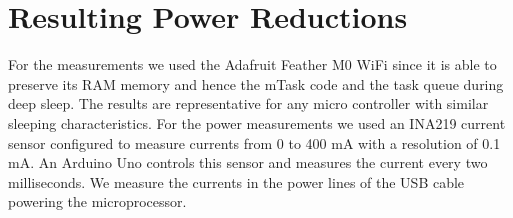 \documentclass[runningheads]{llncs}
\begin{document}







\section{Resulting Power Reductions}

For the measurements we used the Adafruit Feather M0 WiFi since it is able to preserve its RAM memory and hence the mTask code and the task queue during deep sleep.
The results are representative for any micro controller with similar sleeping characteristics.
For the power measurements we used an INA219 current sensor\footnotemark{} configured to measure currents from 0 to 400 mA with a resolution of 0.1 mA.
%
An Arduino Uno controls this sensor and measures the current every two milliseconds.
We measure the currents in the power lines of the USB cable powering the microprocessor.
\end{document}
